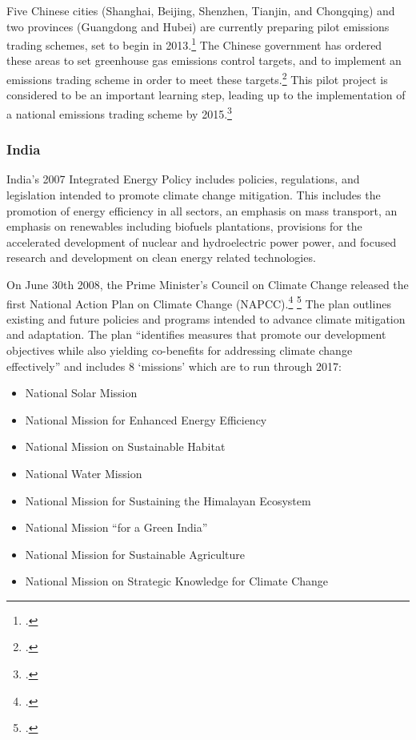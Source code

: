 Five Chinese cities (Shanghai, Beijing, Shenzhen, Tianjin, and Chongqing) and two provinces (Guangdong and Hubei) are currently preparing pilot emissions trading schemes, set to begin in 2013.\footcite[][]{PilotTrading}
The Chinese government has ordered these areas to set greenhouse gas emissions control targets, and to implement an emissions trading scheme in order to meet these targets.\footcite[][]{PilotTrading}
This pilot project is considered to be an important learning step, leading up to the implementation of a national emissions trading scheme by 2015.\footcite[][]{PilotTrading}



	\subsubsection{India}






India's 2007 Integrated Energy Policy includes policies, regulations, and legislation intended to promote climate change mitigation.
This includes the promotion of energy efficiency in all sectors, an emphasis on mass transport, an emphasis on renewables including biofuels plantations, provisions for the accelerated development of nuclear and hydroelectric power power, and focused research and development on clean energy related technologies.




On June 30th 2008, the Prime Minister's Council on Climate Change released the first National Action Plan on Climate Change (NAPCC).\footcite[][]{IndiaPlan2008} \footcite[See also: ][]{IndiaActionSummary}
The plan outlines existing and future policies and programs intended to advance climate mitigation and adaptation. 
The plan ``identifies measures that promote our development objectives while also yielding co-benefits for addressing climate change effectively'' and includes 8 `missions' which are to run through 2017:
\begin{itemize}
	\item National Solar Mission 
	\item National Mission for Enhanced Energy Efficiency
	\item National Mission on Sustainable Habitat
	\item National Water Mission
	\item National Mission for Sustaining the Himalayan Ecosystem
	\item National Mission “for a Green India”
	\item National Mission for Sustainable Agriculture
	\item National Mission on Strategic Knowledge for Climate Change
\end{itemize}



